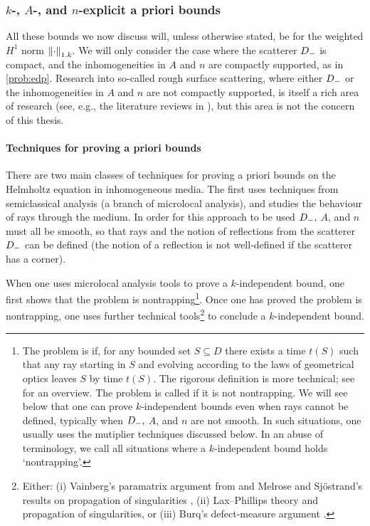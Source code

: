 \subsubsection{$k$-, $A$-, and $n$-explicit a priori bounds}
 All these bounds we now discuss will, unless otherwise stated, be for the weighted $H^1$ norm $\NW{\cdot}.$ We will only consider the case where the scatterer $D_{-}$ is compact, and the inhomogeneities in $A$ and $n$ are compactly supported, as in \cref{prob:edp}. Research into so-called rough surface scattering, where either $D_{-}$ or the inhomogeneities in $A$ and $n$ are not compactly supported, is itself a rich area of research (see, e.g., the literature reviews in \cite{Th:06}), but this area is not the concern of this thesis.


\paragraph{Techniques for proving a priori bounds} There are two main classes of techniques for proving a priori bounds on the Helmholtz equation in inhomogeneous media. The first uses techniques from semiclassical analysis (a branch of microlocal analysis), and studies the behaviour of rays through the medium. In order for this approach to be used $D_{-},$ $A$, and $n$ must all be smooth, so that rays and the notion of reflections from the scatterer $D_{-}$ can be defined (the notion of a reflection is not well-defined if the scatterer has a corner). 

When one uses microlocal analysis tools to prove a $k$-independent bound, one first shows that the problem is nontrapping\footnote{The problem is  if, for any bounded set $S \subseteq D$ there exists a time $t(S)$ such that any ray starting in $S$ and evolving according to the laws of geometrical optics leaves $S$ by time $t(S)$. The rigorous definition is more technical; see \cite[Section 6]{GrPeSp:19} for an overview. The problem is called  if it is not nontrapping. We will see below that one can prove $k$-independent bounds even when rays cannot be defined, typically when $D_{-},$ $A$, and $n$ are not smooth. In such situations, one usually uses the mutiplier techniques discussed below. In an abuse of terminology, we call all situations where a $k$-independent bound holds `nontrapping'.}. Once one has proved the problem is nontrapping, one uses further technical tools\footnote{Either: (i) Vainberg's paramatrix argument from \cite{Va:75} and Melrose and Sj\"ostrand's results on propagation of singularities \cite{MeSj:82}, (ii) Lax--Phillips theory \cite{LaPh:??} and propagation of singularities, or (iii) Burq's defect-measure argument \cite{Bu:02}.} to conclude a $k$-independent bound.

